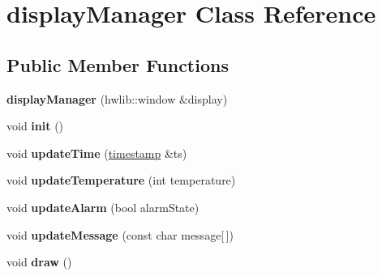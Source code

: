 \hypertarget{classdisplay_manager}{}\section{display\+Manager Class Reference}
\label{classdisplay_manager}
\subsection*{Public Member Functions}
\begin{DoxyCompactItemize}
\item 
\mbox{\label{classdisplay_manager_adf4a6eb6d80c74b0892256458c6b44cc}} 
{\bfseries display\+Manager} (hwlib\+::window \&display)
\item 
\mbox{\label{classdisplay_manager_abd5b651d977ae49f8601e3083e3bb692}} 
void {\bfseries init} ()
\item 
\mbox{\label{classdisplay_manager_a05ebc1c74ae4ef0c3b8d1b1373467eff}} 
void {\bfseries update\+Time} (\mbox{\hyperlink{classtimestamp}{timestamp}} \&ts)
\item 
\mbox{\label{classdisplay_manager_a128805abc4ce7dadf37f8ab602561314}} 
void {\bfseries update\+Temperature} (int temperature)
\item 
\mbox{\label{classdisplay_manager_a7dc28bb62d0ff4789e00e8182185836f}} 
void {\bfseries update\+Alarm} (bool alarm\+State)
\item 
\mbox{\label{classdisplay_manager_af143f0563c82c2668deb2aa3a0afc091}} 
void {\bfseries update\+Message} (const char message\mbox{[}$\,$\mbox{]})
\item 
\mbox{\label{classdisplay_manager_a0781e8ab8eb8531dcf22a16cf32542be}} 
void {\bfseries draw} ()
\end{DoxyCompactItemize}
